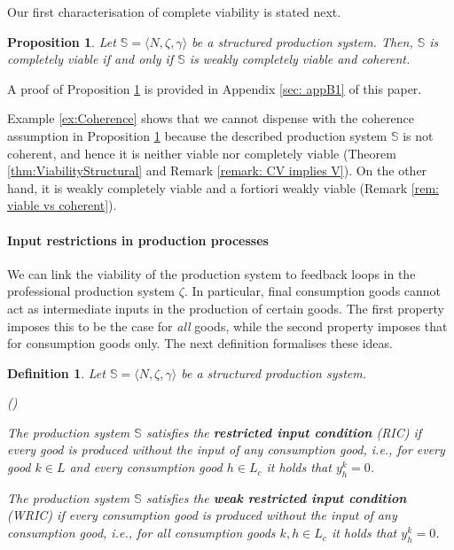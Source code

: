 \documentclass[11pt,fleqn]{article}
\newcounter{llist}
\newenvironment{numm}{\begin{list}{\rm (\roman{llist})}{\usecounter{llist}
	\setlength{\itemindent}{0em} \setlength{\leftmargin}{3.5em}
	\setlength{\labelwidth}{2.5em} \setlength{\labelsep}{1em}}}{\end{list}}
\newtheorem{definition}[theorem]{Definition}
\newtheorem{proposition}[theorem]{Proposition}
\begin{document}
\noindent
Our first characterisation of complete viability is stated next. 

\begin{proposition} \label{prop:CV-WCV}
	Let $\mathbb S = \langle N, \zeta , \gamma \rangle$ be a structured production system. Then, $\mathbb S$ is completely viable if and only if $\mathbb S$ is weakly completely viable and coherent.
\end{proposition}

\noindent
A proof of Proposition \ref{prop:CV-WCV} is provided in Appendix \ref{sec: appB1} of this paper. 

Example \ref{ex:Coherence} shows that we cannot dispense with the coherence assumption in Proposition \ref{prop:CV-WCV} because the described production system $\mathbb{S}$ is not coherent, and hence it is neither viable nor completely viable (Theorem \ref{thm:ViabilityStructural} and Remark \ref{remark: CV implies V}). On the other hand, it is weakly completely viable and a fortiori weakly viable (Remark \ref{rem: viable vs coherent}).

\paragraph{Input restrictions in production processes}

We can link the viability of the production system to feedback loops in the professional production system $\zeta$. In particular, final consumption goods cannot act as intermediate inputs in the production of certain goods. The first property imposes this to be the case for \emph{all} goods, while the second property imposes that for consumption goods only. The next definition formalises these ideas.

\begin{definition}
	Let $\mathbb S = \langle N, \zeta , \gamma \rangle$ be a structured production system.
	\begin{numm}
		\item The production system $\mathbb S$ satisfies the \textbf{restricted input condition} (RIC) if every good is produced without the input of any consumption good, i.e., for every good $k \in L$ and every consumption good $h \in L_c$ it holds that $y^k_h =0$. 
		\item The production system $\mathbb S$ satisfies the \textbf{weak restricted input condition} (WRIC) if every consumption good is produced without the input of any consumption good, i.e., for all consumption goods $k,h \in L_c$ it holds that $y^k_h =0$.
	\end{numm}
\end{definition}
\end{document}
